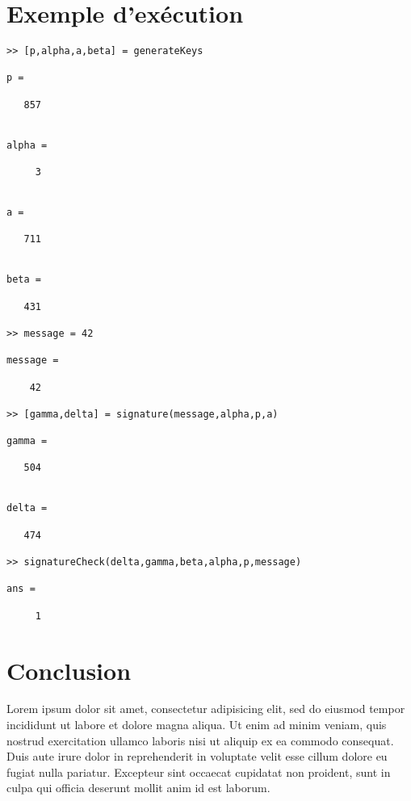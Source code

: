 \documentclass[a4paper]{article}
\begin{document}
\section{Exemple d'exécution}
\begin{verbatim}
>> [p,alpha,a,beta] = generateKeys

p =

   857


alpha =

     3


a =

   711


beta =

   431

>> message = 42

message =

    42

>> [gamma,delta] = signature(message,alpha,p,a)

gamma =

   504


delta =

   474

>> signatureCheck(delta,gamma,beta,alpha,p,message)

ans =

     1
\end{verbatim}
\section{Conclusion}
Lorem ipsum dolor sit amet, consectetur adipisicing elit, sed do eiusmod tempor incididunt ut labore et dolore magna aliqua. Ut enim ad minim veniam, quis nostrud exercitation ullamco laboris nisi ut aliquip ex ea commodo consequat. Duis aute irure dolor in reprehenderit in voluptate velit esse cillum dolore eu fugiat nulla pariatur. Excepteur sint occaecat cupidatat non proident, sunt in culpa qui officia deserunt mollit anim id est laborum.
\end{document}
